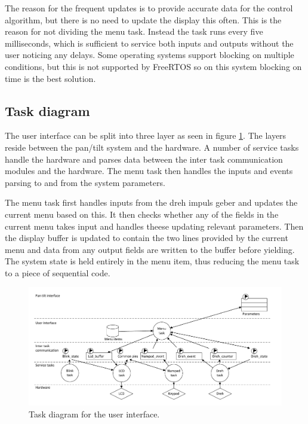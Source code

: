 The reason for the frequent updates is to provide accurate data for the control algorithm, but there is no need to update the display this often. This is the reason for not dividing the menu task. Instead the task runs every five milliseconds, which is sufficient to service both inputs and outputs without the user noticing any delays. Some operating systems support blocking on multiple conditions, but this is not supported by FreeRTOS so on this system blocking on time is the best solution.

\subsection{Task diagram}
The user interface can be split into three layer as seen in figure \ref{fig:ui_task_diagram}. The layers reside between the pan/tilt system and the hardware. A number of service tasks handle the hardware and parses data between the inter task communication modules and the hardware. The menu task then handles the inputs and events parsing to and from the system parameters.

The menu task first handles inputs from the dreh impuls geber and updates the current menu based on this. It then checks whether any of the fields in the current menu takes input and handles theese updating relevant parameters. Then the display buffer is updated to contain the two lines provided by the current menu and data from any output fields are written to the buffer before yielding. The system state is held entirely in the menu item, thus reducing the menu task to a piece of sequential code.

\begin{figure}[htb]
  \centering
  \includegraphics[width=\textwidth,clip,trim=0 5 0 0]{graphics/task_diagram_user_interface.pdf} 
  \caption{Task diagram for the user interface.}
  \label{fig:ui_task_diagram}
\end{figure}

